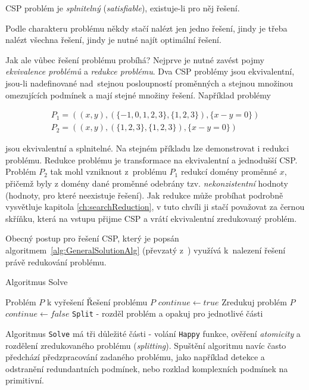 \begin{definition}
\label{def:satisfiability}
CSP problém je \emph{splnitelný} (\emph{satisfiable}), existuje-li pro něj řešení.
\end{definition}

Podle charakteru problému někdy stačí nalézt jen jedno řešení, jindy je třeba nalézt všechna řešení, jindy je nutné najít optimální řešení.

Jak ale vůbec řešení problému probíhá? Nejprve je nutné zavést pojmy \emph{ekvivalence problémů} a \emph{redukce problému}. Dva CSP problémy jsou ekvivalentní, jsou-li nadefinované nad~stejnou posloupností proměnných a stejnou množinou omezujících podmínek a mají stejné množiny řešení. Například problémy

\begin{align*}
P_1 = ((x, y), (\{-1,0,1,2,3\}, \{1,2,3\}), \{x - y = 0\}) \\
P_2 = ((x, y), (\{1,2,3\}, \{1,2,3\}), \{x - y = 0\})
\end{align*}

jsou ekvivalentní a splnitelné. Na stejném příkladu lze demonstrovat i redukci problému. Redukce problému je transformace na ekvivalentní a jednodušší CSP. Problém $P_2$ tak mohl vzniknout z~problému $P_1$ redukcí domény proměnné $x$, přičemž byly z domény dané proměnné odebrány tzv. \emph{nekonzistentní} hodnoty (hodnoty, pro které neexistuje řešení). Jak redukce může probíhat podrobně vysvětluje kapitola \ref{ch:searchReduction}, v tuto chvíli ji stačí považovat za černou skříňku, která na vstupu přijme CSP a vrátí ekvivalentní zredukovaný problém.

Obecný postup pro řešení CSP, který je popsán algoritmem~\ref{alg:GeneralSolutionAlg} (převzatý z~\cite[s.~22]{Vu2005}) využívá k~nalezení řešení právě redukování problému.

\begin{algorithm}
\caption{Algoritmus Solve}
\label{alg:GeneralSolutionAlg}
\begin{algorithmic}[1]
\Require Problém $P$ k vyřešení
\Ensure Řešení problému $P$
\State $continue \gets true$
\State Zredukuj problém $P$
\State $continue \gets false$
\Else
\State \verb|Split| - rozděl problém a opakuj pro jednotlivé části
\EndIf
\EndIf
\EndWhile
\EndProcedure
\end{algorithmic}
\end{algorithm}

Algoritmus \verb|Solve| má tři důležité části - volání \verb|Happy| funkce, ověření \emph{atomicity} a rozdělení zredukovaného problému (\emph{splitting}). Spuštění algoritmu navíc často předchází předzpracování zadaného problému, jako například detekce a odstranění redundantních podmínek, nebo rozklad komplexních podmínek na primitivní.

